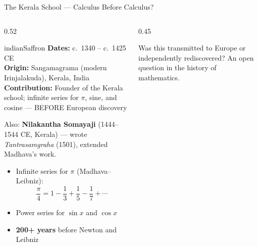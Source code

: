 \begin{frame}[shrink=25]{The Kerala School --- Calculus Before Calculus?}

  \begin{columns}[T]
    \begin{column}{0.52\textwidth}
      \begin{personbox}{indianSaffron}
        \small
        \textbf{Dates:} c.\ 1340 -- c.\ 1425 CE\\
        \textbf{Origin:} Sangamagrama (modern Irinjalakuda), Kerala, India\\
        \textbf{Contribution:} Founder of the Kerala school; infinite series for
        $\pi$, sine, and cosine --- BEFORE European discovery
      \end{personbox}

      \vspace{0.3em}
      Also: \textbf{Nilakantha Somayaji} (1444--1544 CE, Kerala) ---
      wrote \emph{Tantrasamgraha} (1501), extended Madhava's work.

      \vspace{0.3em}
      \begin{itemize}
        \item Infinite series for $\pi$ (Madhava--Leibniz):
          \[
            \frac{\pi}{4} = 1 - \frac{1}{3} + \frac{1}{5} - \frac{1}{7} + \cdots
          \]
        \item Power series for $\sin x$ and $\cos x$
        \item \textbf{200+ years} before Newton and Leibniz
      \end{itemize}
    \end{column}

    \begin{column}{0.45\textwidth}

      \vspace{0.3em}
      \begin{insightbox}
        Was this transmitted to Europe or independently rediscovered? An open question in the history of mathematics.
      \end{insightbox}
    \end{column}
  \end{columns}

\end{frame}

